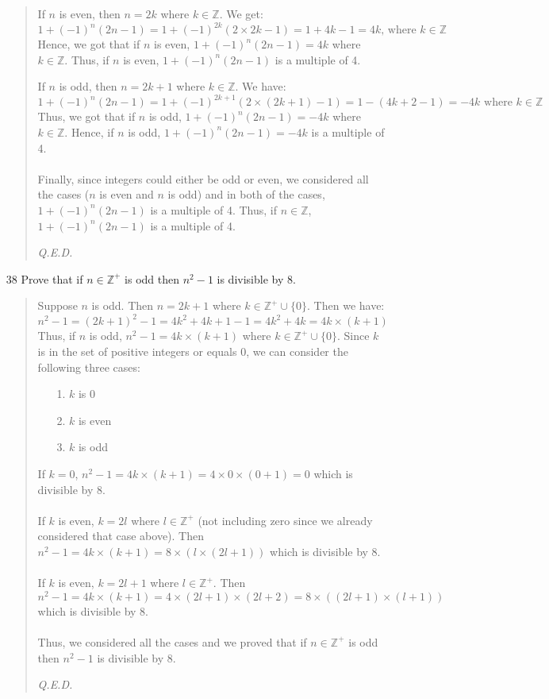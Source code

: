 \documentclass[12pt, a4paper]{article}                      %
\newcommand{\intz}{\mathbb{Z}}
\newcommand{\intzp}{\mathbb{Z^+}}
\begin{document}
\begin{itemize}
\begin{quote}
If $n$ is even, then $n = 2k$ where $k \in \intz$. We get:
$$1 + (-1)^n(2n-1) = 1 + (-1)^{2k}(2 \times 2k-1) = 1 + 4k - 1 = 4k \mbox{, where } k \in \intz$$
Hence, we got that if $n$ is even, $1 + (-1)^n(2n-1) = 4k$ where $k \in \intz$. Thus, if $n$ is even,
$1 + (-1)^n(2n-1)$ is a multiple of 4.

If $n$ is odd, then $n = 2k + 1$ where $k \in \intz$. We have:
$$1 + (-1)^n(2n-1) = 1 + (-1)^{2k+1}(2 \times (2k + 1)-1) = 1  - (4k + 2 - 1) = -4k \mbox{ where } k \in \intz$$
Thus, we got that if $n$ is odd, $1 + (-1)^n(2n-1) = -4k$ where $k \in \intz$. Hence, if $n$ is odd,
$1 + (-1)^n(2n-1) = -4k$ is a multiple of 4.
\\\\
Finally, since integers could either be odd or even, we considered all the cases ($n$ is even and $n$ is odd) and in
both of the cases, $1 + (-1)^n(2n-1)$ is a multiple of 4. Thus, if $n \in \intz$, $1 + (-1)^n(2n-1)$ is a multiple of 4.
\begin{flushright}
\textit{Q.E.D.}
\end{flushright}
\end{quote}

\item[38]
Prove that if $n \in \intzp$ is odd then $n^2 - 1$ is divisible by 8.
\begin{quote}
Suppose $n$ is odd. Then $n = 2k + 1$ where $k \in \intzp \cup \{0\}$.
Then we have:
$$n^2 - 1 = (2k + 1)^2 - 1 = 4k^2 + 4k + 1 - 1 = 4k^2 + 4k = 4k \times (k + 1)$$
Thus, if $n$ is odd, $n^2 - 1 = 4k \times (k + 1)$ where $k \in \intzp \cup \{0\}$.
Since $k$ is in the set of positive integers or equals 0, we can consider the following
three cases:
\begin{itemize}
\item[1.]
$k$ is 0
\item[2.]
$k$ is even
\item[3.]
$k$ is odd\\
\end{itemize}
If $k = 0$, $n^2 - 1 = 4k \times (k + 1) = 4 \times 0 \times (0 + 1) = 0$ which is divisible by 8.
\\\\
If $k$ is even, $k = 2l$ where $l \in \intzp$ (not including zero since we already considered that case above).
Then $n^2 - 1 = 4k \times (k + 1) = 8 \times (l \times (2l + 1))$ which is divisible by 8.
\\\\
If $k$ is even, $k = 2l + 1$ where $l \in \intzp$.
Then $n^2 - 1 = 4k \times (k + 1) = 4 \times (2l + 1) \times (2l + 2) = 8 \times ((2l + 1) \times (l + 1))$ which
is divisible by 8.
\\\\
Thus, we considered all the cases and we proved that if $n \in \intzp$ is odd then $n^2 - 1$ is divisible by 8.
\begin{flushright}
\textit{Q.E.D.}
\end{flushright}
\end{quote}


\end{itemize}
\end{document}
